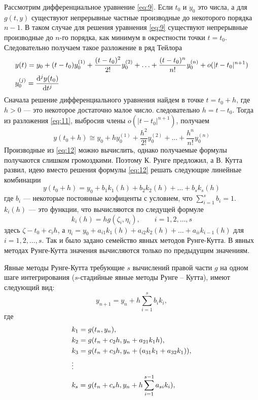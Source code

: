 \documentclass[a4paper,12pt]{article}
\newcommand{\dd}{\mathrm{d}}
\begin{document}
	Рассмотрим дифференциальное уравнение \eqref{eq:9}. Если \(t_0\) и \(y_0\) это числа, а для \(g(t,y)\) существуют непрерывные частные производные до некоторого порядка \(n-1\). В таком случае для решения уравнения \eqref{eq:9} существуют непрерывные производные до \(n\)-го порядка, как минимум в окрестности точки \(t=t_0\). Следовательно получаем такое разложение в ряд Тейлора
	\begin{equation}\label{eq:11}
		\begin{lgathered} 
			y(t)=y_0+(t-t_0)y_0^{(1)}+\frac{(t-t_0)^2}{2!}y_0^{(2)}+\ldots+\frac{(t-t_0)^n}{n!}y_0^{(n)}+o(|t-t_0|^{n+1})\\
			y_0^{(j)}=\frac{\dd^j y(t_0)}{\dd t^j}
		\end{lgathered}
	\end{equation}
	Сначала решение дифференциального уравнения найдем в точке \(t=t_0+h\), где \(h>0\) --- это некоторое достаточно малое число. следовательно \(h=t-t_0\). Тогда из разложения \eqref{eq:11}, выбросив члены \(o(|t-t_0|^{n+1})\), получаем
	\begin{equation}\label{eq:12} 
		y(t_0+h)\cong y_0+hy_0^{(1)}+\frac{h^2}{2!}y_0^{(2)}+\ldots+\frac{h^n}{n!}y_0^{(n)}
	\end{equation}
	Производные из \eqref{eq:12} можно вычислить, однако получаемые формулы получаются слишком громоздкими. Поэтому К. Рунге предложил, а В. Кутта развил, идею вместо решения формулы \eqref{eq:12} решать следующие линейные комбинации
	\begin{equation}\label{eq:13} 
		y(t_0+h)= y_0+b_1k_1(h)+b_2k_2(h)+\ldots+b_sk_s(h)
	\end{equation}
	где \(b_i\) --- некоторые постоянные коэфиценты с условием, что \(\sum_{i=1}^{s}b_i=1\). \(k_i(h)\) --- это функции, что вычисляются по следущей формуле
	 \begin{equation}\label{eq:14} 
		k_i(h)=hg(\zeta_i,\eta_i),\qquad i=1,2,\ldots,s
	\end{equation}
	здесь \(\zeta-t_0+c_ih\), а \(\eta_i=y_0+a_{i1}k_1(h)+a_{i2}k_2(h)+\ldots+a_{ii}k_{i-1}(h)\) для \(i=1,2,\ldots,s\).
	Так и было задано семейство явных методов Рунге-Кутта. В явных методах Рунге-Кутта значения вычисляются только по предыдущим значениям.

	Явные методы Рунге-Кутта требующие \(s\) вычислений правой части \(g\) на одном шаге интегрирования  (\(s\)-стадийные явные методы Рунге – Кутта), имеют следующий вид:
	\begin{equation}\label{eq:2} 
		y_{n+1}=y_n+h\sum_{i=1}^{s}b_ik_i,
	\end{equation}
	где
	\begin{equation}\label{eq:2} 
		\begin{lgathered} 
			k_1=g(t_n, y_n),\\
			k_2=g(t_n+c_2h, y_n+a_{21}k_1h),\\
			k_3=g(t_n+c_3h, y_n+(a_{31}k_1+a_{32}k_1)),\\
			\vdots\\
			k_s=g(t_n+c_sh, y_n+h\sum_{i=1}^{s-1}a_{si}k_i),\\
		\end{lgathered}
	\end{equation}
\end{document}
